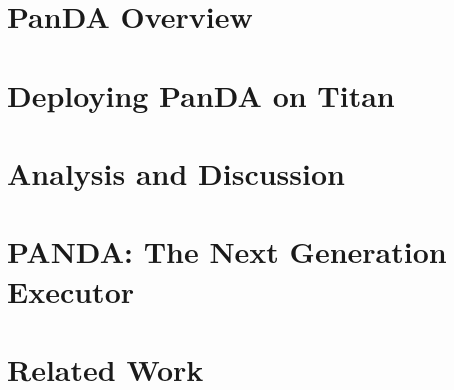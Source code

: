 \documentclass[sigconf, screen]{acmart}
\begin{document}
\section{PanDA Overview}
\label{sec:panda_overview}


\section{Deploying PanDA on Titan}
\label{sec:panda_titan}


\section{Analysis and Discussion}
\label{sec:panda_titan}




\section{PANDA\@: The Next Generation Executor}
\label{sec:panda_roadmap}





\section{Related Work}
\label{sec:related}
\end{document}

